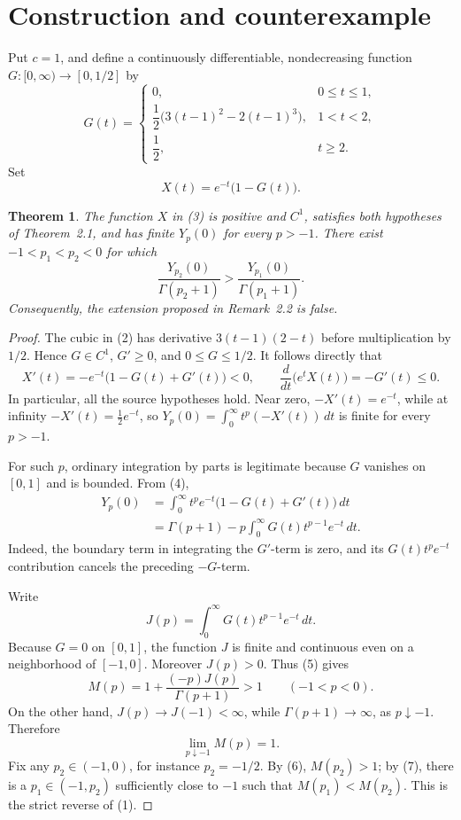 \documentclass[11pt]{article}
\newtheorem{theorem}{Theorem}
\begin{document}
\section{Construction and counterexample}

Put \(c=1\), and define a continuously differentiable, nondecreasing function
\(G:[0,\infty)\to[0,1/2]\) by
\[
G(t)=
\begin{cases}
0, & 0\leq t\leq1,\\[2pt]
\dfrac12\bigl(3(t-1)^2-2(t-1)^3\bigr), & 1<t<2,\\[4pt]
\dfrac12, & t\geq2.
\end{cases}                                                   \tag{2}
\]
Set
\[
 X(t)=e^{-t}\bigl(1-G(t)\bigr).                              \tag{3}
\]

\begin{theorem}
The function \(X\) in \emph{(3)} is positive and \(C^1\), satisfies both
hypotheses of Theorem~2.1, and has finite \(Y_p(0)\) for every \(p>-1\).
There exist \(-1<p_1<p_2<0\) for which
\[
 \frac{Y_{p_2}(0)}{\Gamma(p_2+1)}
 >
 \frac{Y_{p_1}(0)}{\Gamma(p_1+1)}.
\]
Consequently, the extension proposed in Remark~2.2 is false.
\end{theorem}

\begin{proof}
The cubic in (2) has derivative \(3(t-1)(2-t)\) before multiplication
by \(1/2\).  Hence \(G\in C^1\), \(G'\geq0\), and \(0\leq G\leq1/2\).
It follows directly that
\[
 X'(t)=-e^{-t}\bigl(1-G(t)+G'(t)\bigr)<0,
 \qquad
 \frac{d}{dt}\bigl(e^tX(t)\bigr)=-G'(t)\leq0.               \tag{4}
\]
In particular, all the source hypotheses hold.  Near zero, \(-X'(t)=e^{-t}\),
while at infinity \(-X'(t)=\tfrac12e^{-t}\), so
\(Y_p(0)=\int_0^\infty t^p(-X'(t))\,dt\) is finite for every \(p>-1\).

For such \(p\), ordinary integration by parts is legitimate because \(G\)
vanishes on \([0,1]\) and is bounded.  From (4),
\begin{align*}
Y_p(0)
 &=\int_0^\infty t^pe^{-t}\bigl(1-G(t)+G'(t)\bigr)\,dt\\
 &=\Gamma(p+1)-p\int_0^\infty G(t)t^{p-1}e^{-t}\,dt.         \tag{5}
\end{align*}
Indeed, the boundary term in integrating the \(G'\)-term is zero, and its
\(G(t)t^pe^{-t}\) contribution cancels the preceding \(-G\)-term.

Write
\[
 J(p)=\int_0^\infty G(t)t^{p-1}e^{-t}\,dt.
\]
Because \(G=0\) on \([0,1]\), the function \(J\) is finite and continuous
even on a neighborhood of \([-1,0]\).  Moreover \(J(p)>0\).  Thus (5) gives
\[
 M(p)=1+\frac{(-p)J(p)}{\Gamma(p+1)}>1
 \qquad(-1<p<0).                                             \tag{6}
\]
On the other hand, \(J(p)\to J(-1)<\infty\), while
\(\Gamma(p+1)\to\infty\), as \(p\downarrow-1\).  Therefore
\[
 \lim_{p\downarrow-1}M(p)=1.                                \tag{7}
\]
Fix any \(p_2\in(-1,0)\), for instance \(p_2=-1/2\).  By (6),
\(M(p_2)>1\); by (7), there is a \(p_1\in(-1,p_2)\) sufficiently close to
\(-1\) such that \(M(p_1)<M(p_2)\).  This is the strict reverse of (1).
\end{proof}
\end{document}
